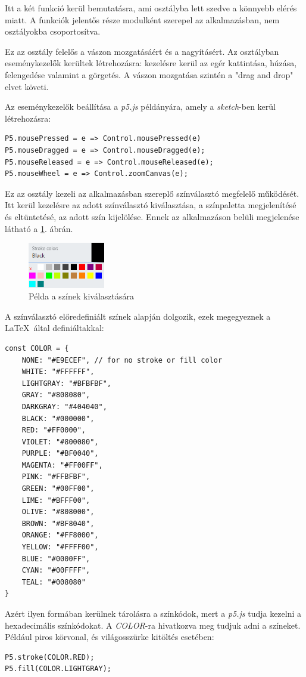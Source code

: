 
Itt a két funkció kerül bemutatásra, ami osztályba lett szedve a könnyebb elérés miatt. A funkciók jelentős része modulként szerepel az alkalmazásban, nem osztályokba csoportosítva.


Ez az osztály felelős a vászon mozgatásáért és a nagyításért. Az osztályban eseménykezelők kerültek létrehozásra: kezelésre kerül az egér kattintása, húzása, felengedése valamint a görgetés. A vászon mozgatása szintén a "drag and drop" elvet követi.

Az eseménykezelők beállítása a \textit{p5.js} példányára, amely a \textit{sketch}-ben kerül létrehozásra:

\begin{lstlisting}[style=es6, morekeywords={P5, Control}]
P5.mousePressed = e => Control.mousePressed(e)
P5.mouseDragged = e => Control.mouseDragged(e);
P5.mouseReleased = e => Control.mouseReleased(e);
P5.mouseWheel = e => Control.zoomCanvas(e);
\end{lstlisting}


Ez az osztály kezeli az alkalmazásban szereplő színválasztó megfelelő működését. Itt kerül kezelésre az adott színválasztó kiválasztása, a színpaletta megjelenítésé és eltüntetésé, az adott szín kijelölése. Ennek az alkalmazáson belüli megjelenése látható a \ref{fig:cp2}. ábrán.

\begin{figure}[!h]
	\centering
	\includegraphics[width=0.3\textwidth]{images/colorpicker.png}
	\caption{Példa a színek kiválasztására}
	\label{fig:cp2}
\end{figure}

A színválasztó előredefiniált színek alapján dolgozik, ezek megegyeznek a \LaTeX\ által definiáltakkal:

\begin{lstlisting}[style=es6]
const COLOR = {
	NONE: "#E9ECEF", // for no stroke or fill color
	WHITE: "#FFFFFF",
	LIGHTGRAY: "#BFBFBF",
	GRAY: "#808080",
	DARKGRAY: "#404040",
	BLACK: "#000000",
	RED: "#FF0000",
	VIOLET: "#800080",
	PURPLE: "#BF0040",
	MAGENTA: "#FF00FF",
	PINK: "#FFBFBF",
	GREEN: "#00FF00",
	LIME: "#BFFF00",
	OLIVE: "#808000",
	BROWN: "#BF8040",
	ORANGE: "#FF8000",
	YELLOW: "#FFFF00",
	BLUE: "#0000FF",
	CYAN: "#00FFFF",
	TEAL: "#008080"
}
\end{lstlisting}

Azért ilyen formában kerülnek tárolásra a színkódok, mert a \textit{p5.js} tudja kezelni a hexadecimális színkódokat. A \textit{COLOR}-ra hivatkozva meg tudjuk adni a színeket. Például piros körvonal, és világosszürke kitöltés esetében:
\begin{lstlisting}[style=es6, morekeywords={P5, COLOR}]
P5.stroke(COLOR.RED);
P5.fill(COLOR.LIGHTGRAY);
\end{lstlisting}